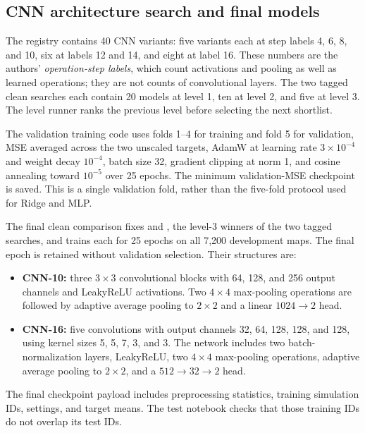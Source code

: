 \documentclass[11pt,a4paper]{article}
\newcommand{\model}[1]{\texttt{\detokenize{#1}}}
\begin{document}
\subsection{CNN architecture search and final models}
The registry contains 40 CNN variants: five variants each at step labels 4, 6, 8, and 10, six at labels 12 and 14, and eight at label 16. These numbers are the authors' \emph{operation-step labels}, which count activations and pooling as well as learned operations; they are not counts of convolutional layers. The two tagged clean searches each contain 20 models at level 1, ten at level 2, and five at level 3. The level runner ranks the previous level before selecting the next shortlist.

The validation training code uses folds 1--4 for training and fold 5 for validation, MSE averaged across the two unscaled targets, AdamW at learning rate $3\times10^{-4}$ and weight decay $10^{-4}$, batch size 32, gradient clipping at norm 1, and cosine annealing toward $10^{-5}$ over 25 epochs. The minimum validation-MSE checkpoint is saved. This is a single validation fold, rather than the five-fold protocol used for Ridge and MLP.

The final clean comparison fixes \model{model_10_5} and \model{model_16_5}, the level-3 winners of the two tagged searches, and trains each for 25 epochs on all 7,200 development maps. The final epoch is retained without validation selection. Their structures are:
\begin{itemize}
\item \textbf{CNN-10:} three $3\times3$ convolutional blocks with 64, 128, and 256 output channels and LeakyReLU activations. Two $4\times4$ max-pooling operations are followed by adaptive average pooling to $2\times2$ and a linear $1024\rightarrow2$ head.
\item \textbf{CNN-16:} five convolutions with output channels 32, 64, 128, 128, and 128, using kernel sizes 5, 5, 7, 3, and 3. The network includes two batch-normalization layers, LeakyReLU, two $4\times4$ max-pooling operations, adaptive average pooling to $2\times2$, and a $512\rightarrow32\rightarrow2$ head.
\end{itemize}
The final checkpoint payload includes preprocessing statistics, training simulation IDs, settings, and target means. The test notebook checks that those training IDs do not overlap its test IDs.
\end{document}
